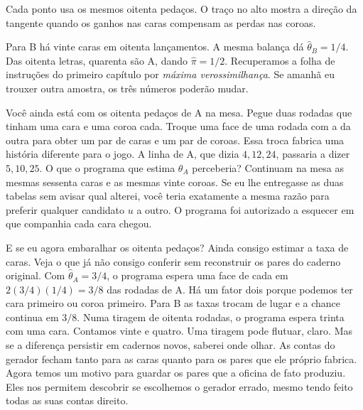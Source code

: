 \par\addvspace{5pt}\noindent\begin{minipage}{\linewidth}\centering
{}\par
{\footnotesize\raggedright Cada ponto usa os mesmos oitenta pedaços. O traço no alto mostra a direção da tangente quando os ganhos nas caras compensam as perdas nas coroas.\par}
\end{minipage}\par\addvspace{5pt}

Para B há vinte caras em oitenta lançamentos. A mesma balança dá $\widehat\theta_B=1/4$. Das oitenta letras, quarenta são A, dando $\widehat\pi=1/2$. Recuperamos a folha de instruções do primeiro capítulo por \emph{máxima verossimilhança}. Se amanhã eu trouxer outra amostra, os três números poderão mudar.

Você ainda está com os oitenta pedaços de A na mesa. Pegue duas rodadas que tinham uma cara e uma coroa cada. Troque uma face de uma rodada com a da outra para obter um par de caras e um par de coroas. Essa troca fabrica uma história diferente para o jogo. A linha de A, que dizia $4,12,24$, passaria a dizer $5,10,25$. O que o programa que estima $\theta_A$ perceberia? Continuam na mesa as mesmas sessenta caras e as mesmas vinte coroas. Se eu lhe entregasse as duas tabelas sem avisar qual alterei, você teria exatamente a mesma razão para preferir qualquer candidato $u$ a outro. O programa foi autorizado a esquecer em que companhia cada cara chegou.

E se eu agora embaralhar os oitenta pedaços? Ainda consigo estimar a taxa de caras. Veja o que já não consigo conferir sem reconstruir os pares do caderno original. Com $\widehat\theta_A=3/4$, o programa espera uma face de cada em $2(3/4)(1/4)=3/8$ das rodadas de A. Há um fator dois porque podemos ter cara primeiro ou coroa primeiro. Para B as taxas trocam de lugar e a chance continua em $3/8$. Numa tiragem de oitenta rodadas, o programa espera trinta com uma cara. Contamos vinte e quatro. Uma tiragem pode flutuar, claro. Mas se a diferença persistir em cadernos novos, saberei onde olhar. As contas do gerador fecham tanto para as caras quanto para os pares que ele próprio fabrica. Agora temos um motivo para guardar os pares que a oficina de fato produziu. Eles nos permitem descobrir se escolhemos o gerador errado, mesmo tendo feito todas as suas contas direito.

